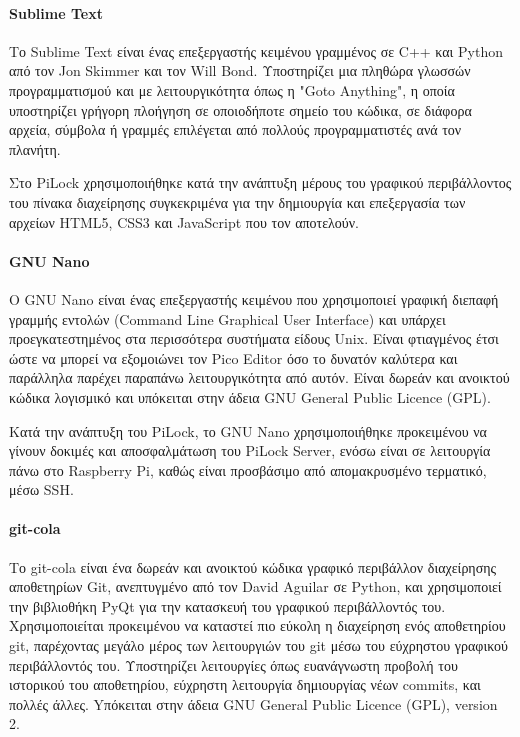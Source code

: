  			\paragraph{Sublime Text}
 				Το Sublime Text είναι ένας επεξεργαστής κειμένου γραμμένος σε C++ και Python από τον Jon Skimmer και τον Will Bond. Υποστηρίζει μια πληθώρα γλωσσών προγραμματισμού και με λειτουργικότητα όπως η "Goto Anything", η οποία υποστηρίζει γρήγορη πλοήγηση σε οποιοδήποτε σημείο του κώδικα, σε διάφορα αρχεία, σύμβολα ή γραμμές επιλέγεται από πολλούς προγραμματιστές ανά τον πλανήτη.

 				Στο PiLock χρησιμοποιήθηκε κατά την ανάπτυξη μέρους του γραφικού περιβάλλοντος του πίνακα διαχείρησης συγκεκριμένα για την δημιουργία και επεξεργασία των αρχείων HTML5, CSS3 και JavaScript που τον αποτελούν.

 			\paragraph{GNU Nano}
 				Ο GNU Nano είναι ένας επεξεργαστής κειμένου που χρησιμοποιεί γραφική διεπαφή γραμμής εντολών (Command Line Graphical User Interface) και υπάρχει προεγκατεστημένος στα περισσότερα συστήματα είδους Unix. Είναι φτιαγμένος έτσι ώστε να μπορεί να εξομοιώνει τον Pico Editor όσο το δυνατόν καλύτερα και παράλληλα παρέχει παραπάνω λειτουργικότητα από αυτόν. Είναι δωρεάν και ανοικτού κώδικα λογισμικό και υπόκειται στην άδεια GNU General Public Licence (GPL).

 				Κατά την ανάπτυξη του PiLock, το GNU Nano χρησιμοποιήθηκε προκειμένου να γίνουν δοκιμές και αποσφαλμάτωση του PiLock Server, ενόσω είναι σε λειτουργία πάνω στο Raspberry Pi, καθώς είναι προσβάσιμο από απομακρυσμένο τερματικό, μέσω SSH.

 			\paragraph{git-cola}
 				Το git-cola είναι ένα δωρεάν και ανοικτού κώδικα γραφικό περιβάλλον διαχείρησης αποθετηρίων Git, ανεπτυγμένο από τον David Aguilar σε Python, και χρησιμοποιεί την βιβλιοθήκη PyQt για την κατασκευή του γραφικού περιβάλλοντός του. Χρησιμοποιείται προκειμένου να καταστεί πιο εύκολη η διαχείρηση ενός αποθετηρίου git, παρέχοντας μεγάλο μέρος των λειτουργιών του git μέσω του εύχρηστου γραφικού περιβάλλοντός του. Υποστηρίζει λειτουργίες όπως ευανάγνωστη προβολή του ιστορικού του αποθετηρίου, εύχρηστη λειτουργία δημιουργίας νέων commits, και πολλές άλλες. Yπόκειται στην άδεια GNU General Public Licence (GPL), version 2.